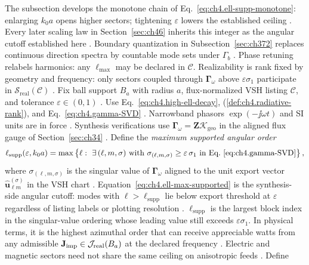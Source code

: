 The subsection develops the monotone chain of Eq.~\eqref{eq:ch4.ell-supp-monotone}: enlarging $k_0 a$ opens higher sectors; tightening $\varepsilon$ lowers the established ceiling \cite{hansen1988}. Every later scaling law in Section~\ref{sec:ch46} inherits this integer as the angular cutoff established here \cite{stratton1941}.
Boundary quantization in Subsection~\ref{sec:ch372} replaces continuous direction spectra by countable mode sets under
\(\Gamma_{b}\) \cite{stratton1941}. Phase retuning relabels harmonics: any \(\ell_{\max}\) may be
declared in \(\mathcal{C}\). Realizability is rank fixed by geometry and frequency: only sectors coupled through \(\boldsymbol{\Gamma}_\omega\) above
\(\varepsilon\sigma_{1}\) participate in \(\mathcal{S}_{\mathrm{real}}(\mathcal{C})\) \cite{stratton1941}.
Fix ball support \(B_{a}\) with radius \(a\), flux-normalized VSH listing \(\mathcal{C}\), and tolerance \(\varepsilon\in(0,1)\)
\cite{stratton1941}. Use Eq.~\eqref{eq:ch4.high-ell-decay}, (\ref{def:ch4.radiative-rank}), and
Eq.~\eqref{eq:ch4.gamma-SVD} \cite{harrington2001}. Narrowband phasors \(\exp(-\jj\omega t)\) and SI units are in force
\cite{jackson1999}. Synthesis verifications use \(\boldsymbol{\Gamma}_\omega=\mathbf{Z}\boldsymbol{\mathcal{K}}_{\mathrm{geo}}\) in the aligned
flux gauge of Section~\ref{sec:ch34} \cite{hansen1988}.
Define the \emph{maximum supported angular order}
\begin{equation}
\label{eq:ch4.ell-max-supported}
\ell_{\mathrm{supp}}(\varepsilon,k_{0}a)
=
\max\left\{
\ell:\ \exists\,(\ell,m,\sigma)\ \text{with}\ 
\sigma_{(\ell,m,\sigma)}\ge\varepsilon\,\sigma_{1}
\ \text{in Eq.~\eqref{eq:ch4.gamma-SVD}}
\right\},
\end{equation}
where \(\sigma_{(\ell,m,\sigma)}\) is the singular value of \(\boldsymbol{\Gamma}_\omega\) aligned to the unit export vector
\(\widehat{\mathbf{u}}_{\ell m}^{(\sigma)}\) in the VSH chart \cite{harrington2001}. Equation~\eqref{eq:ch4.ell-max-supported}
is the synthesis-side angular cutoff: modes with \(\ell>\ell_{\mathrm{supp}}\) lie below export threshold at \(\varepsilon\) regardless of
listing labels or plotting resolution \cite{stratton1941}. \(\ell_{\mathrm{supp}}\) is the largest block index in
the singular-value ordering whose leading value still exceeds \(\varepsilon\sigma_{1}\). In physical terms, it is the highest azimuthal order that
can receive appreciable watts from any admissible \(\mathbf{J}_{\mathrm{imp}}\in\mathcal{J}_{\mathrm{real}}(B_{a})\) at the declared frequency
\cite{hansen1988}.
Electric and magnetic sectors need not share the same ceiling on anisotropic feeds \cite{harrington2001}. Define
